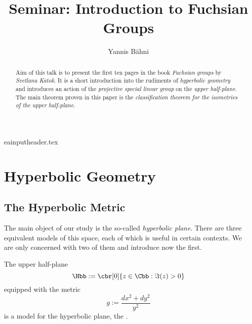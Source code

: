 eainput{header.tex}

\title{Seminar: Introduction to Fuchsian Groups}
\author{Yannis B\"{a}hni}
\address[Yannis B\"{a}hni]{University of Zurich, R\"{a}mistrasse 71, 8006 Zurich}



\maketitle

\begin{abstract}
	Aim of this talk is to present the first ten pages in the book \emph{Fuchsian groups} by \emph{Svetlana Katok}. It is a short introduction into the rudiments of \emph{hyperbolic geometry} and introduces an action of the \emph{projective special linear group} on the \emph{upper half-plane}. The main theorem proven in this paper is the \emph{classification theorem for the isometries of the upper half-plane}.
\end{abstract}

\tableofcontents

\section{Hyperbolic Geometry}
\subsection{The Hyperbolic Metric}
The main object of our study is the so-called \emph{hyperbolic plane}. There are three equivalent models of this space, each of which is useful in certain contexts. We are only concerned with two of them and introduce now the first. 

\begin{definition}
	The upper half-plane
	\begin{equation}
		\Hbb := \cbr[0]{z \in \Cbb : \Im(z) > 0}
	\end{equation}
	\noindent equipped with the metric
	\begin{equation}
		g := \frac{dx^2 + dy^2}{y^2}
	\end{equation}
	\noindent is a model for the hyperbolic plane, the .
	\label{def:half_space_model}
\end{definition}


